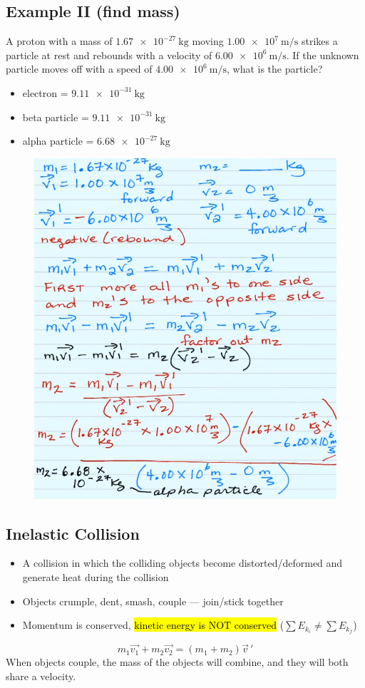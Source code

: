 \documentclass[a4paper,12pt]{article}
\begin{document}
\subsection{Example II (find mass)}
A proton with a mass of $\SI{1.67e-27}{\kg}$ moving $\SI{1.00e7}{\m\per\s}$ strikes a particle at rest and rebounds with a velocity of $\SI{6.00e6}{\m\per\s}$. If the unknown particle moves off with a speed of $\SI{4.00e6}{\m\per\s}$, what is the particle?
\begin{itemize}
    \item{electron = $\SI{9.11e-31}{\kg}$}
    \item{beta particle = $\SI{9.11e-31}{\kg}$}
    \item{alpha particle = $\SI{6.68e-27}{\kg}$}
\end{itemize}

\begin{figure}[H]
    \centering
    \includegraphics[width=\textwidth]{q-elastic-2}
\end{figure}

\subsection{Inelastic Collision}
\begin{itemize}
    \item{A collision in which the colliding objects become distorted/deformed and generate heat during the collision}
    \item{Objects crumple, dent, smash, couple --- join/stick together}
    \item{Momentum is conserved, \hl{kinetic energy is NOT conserved} ($\sum E_{k_i} \neq \sum E_{k_f}$)}
\end{itemize}
\Large $$m_1\vec{v_1} + m_2\vec{v_2} = (m_1+m_2)\vec{v}\,'$$ \normalsize
When objects couple, the mass of the objects will combine, and they will both share a velocity.
\end{document}
